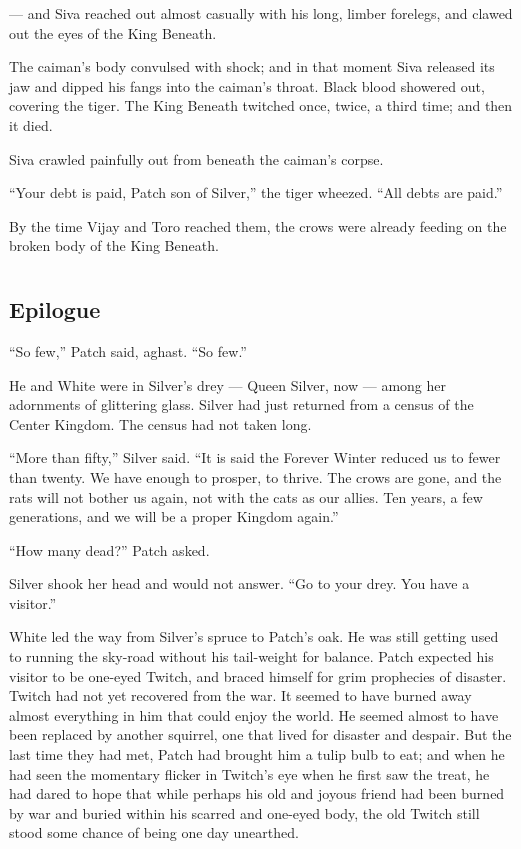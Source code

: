 \documentclass[ebook,oneside,openany,17pt]{memoir}
\newenvironment{tolerant}[1]{%
  \par\tolerance=#1\relax
}{%
  \par
}
\renewcommand{\thechapter}{\Roman{chapter}}
\newcounter{sections}
\newcommand{\sections}[1]{%
  \section*{#1}
  \addtocounter{sections}{1}%
  \pdfbookmark[1]{#1}{section.\thechapter.\thesections}}
\begin{document}
— and Siva reached out almost casually with his long, limber forelegs,
and clawed out the eyes of the King Beneath.

\begin{tolerant}{500}
The caiman’s body convulsed with shock; and in that moment Siva
released its jaw and dipped his fangs into the caiman’s throat. Black
blood showered out, covering the tiger. The King Beneath twitch\-ed
once, twice, a third time; and then it died.
\end{tolerant}

\begin{tolerant}{500}
Siva crawled painfully out from beneath the cai\-man’s corpse.
\end{tolerant}

“Your debt is paid, Patch son of Silver,” the tiger wheezed. “All
debts are paid.”

By the time Vijay and Toro reached them, the crows were already
feeding on the broken body of the King Beneath.


\chapter{}

\sections{Epilogue}

“So few,” Patch said, aghast. “So few.”

\begin{tolerant}{500}
He and White were in Silver’s drey — Queen Silver, now — among her
adornments of glittering glass. Silver had just returned from a census
of the Center Kingdom. The census had not taken long.
\end{tolerant}

“More than fifty,” Silver said. “It is said the Forever Winter reduced
us to fewer than twenty. We have enough to prosper, to thrive. The
crows are gone, and the rats will not bother us again, not with the
cats as our allies. Ten years, a few generations, and we will be a
proper Kingdom again.”

“How many dead?” Patch asked.

Silver shook her head and would not answer. “Go to your drey. You have
a visitor.”

White led the way from Silver’s spruce to Patch’s oak. He was still
getting used to running the sky-road without his tail-weight for
balance. Patch expected his visitor to be one-eyed Twitch, and braced
himself for grim prophecies of disaster. Twitch had not yet recovered
from the war. It seemed to have burned away almost everything in him
that could enjoy the world. He seemed almost to have been replaced by
another squirrel, one that lived for disaster and despair. But the
last time they had met, Patch had brought him a tulip bulb to eat; and
when he had seen the momentary flicker in Twitch’s eye when he first
saw the treat, he had dared to hope that while perhaps his old and
joyous friend had been burned by war and buried within his scarred and
one-eyed body, the old Twitch still stood some chance of being one day
unearthed.
\end{document}
